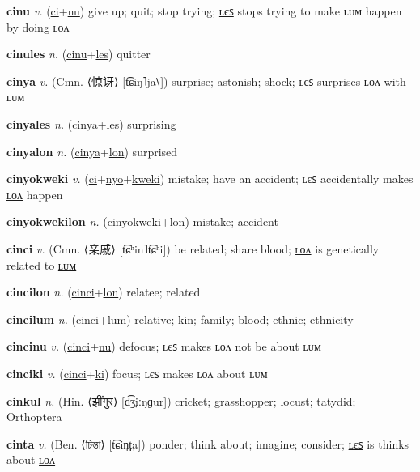 \textbf{\hypertarget{cinu}{cinu}} \textit{v.} (\hyperlink{ci}{ci}+\allowbreak \hyperlink{nu}{nu})
give up; quit; stop trying; \hyperlink{cinules}{ʟєꜱ} stops trying to make ʟᴜᴍ happen by doing ʟᴏᴧ

\textbf{\hypertarget{cinules}{cinules}} \textit{n.} (\hyperlink{cinu}{cinu}+\allowbreak \hyperlink{les}{les})
quitter

\textbf{\hypertarget{cinya}{cinya}} \textit{v.} (Cmn. ⟨{\chinese{}惊讶}⟩ [t͡ɕiŋ˥ja˥˩])
surprise; astonish; shock; \hyperlink{cinyales}{ʟєꜱ} surprises \hyperlink{cinyalon}{ʟᴏᴧ} with ʟᴜᴍ

\textbf{\hypertarget{cinyales}{cinyales}} \textit{n.} (\hyperlink{cinya}{cinya}+\allowbreak \hyperlink{les}{les})
surprising

\textbf{\hypertarget{cinyalon}{cinyalon}} \textit{n.} (\hyperlink{cinya}{cinya}+\allowbreak \hyperlink{lon}{lon})
surprised

\textbf{\hypertarget{cinyokweki}{cinyokweki}} \textit{v.} (\hyperlink{ci}{ci}+\allowbreak \hyperlink{nyo}{nyo}+\allowbreak \hyperlink{kweki}{kweki})
mistake; have an accident; ʟєꜱ accidentally makes \hyperlink{cinyokwekilon}{ʟᴏᴧ} happen

\textbf{\hypertarget{cinyokwekilon}{cinyokwekilon}} \textit{n.} (\hyperlink{cinyokweki}{cinyokweki}+\allowbreak \hyperlink{lon}{lon})
mistake; accident

\textbf{\hypertarget{cinci}{cinci}} \textit{v.} (Cmn. ⟨{\chinese{}亲戚}⟩ [t͡ɕʰin˥t͡ɕʰi])
be related; share blood; \hyperlink{cincilon}{ʟᴏᴧ} is genetically related to \hyperlink{cincilum}{ʟᴜᴍ}

\textbf{\hypertarget{cincilon}{cincilon}} \textit{n.} (\hyperlink{cinci}{cinci}+\allowbreak \hyperlink{lon}{lon})
relatee; related

\textbf{\hypertarget{cincilum}{cincilum}} \textit{n.} (\hyperlink{cinci}{cinci}+\allowbreak \hyperlink{lum}{lum})
relative; kin; family; blood; ethnic; ethnicity

\textbf{\hypertarget{cincinu}{cincinu}} \textit{v.} (\hyperlink{cinci}{cinci}+\allowbreak \hyperlink{nu}{nu})
defocus; ʟєꜱ makes ʟᴏᴧ not be about ʟᴜᴍ

\textbf{\hypertarget{cinciki}{cinciki}} \textit{v.} (\hyperlink{cinci}{cinci}+\allowbreak \hyperlink{ki}{ki})
focus; ʟєꜱ makes ʟᴏᴧ about ʟᴜᴍ

\textbf{\hypertarget{cinkul}{cinkul}} \textit{n.} (Hin. ⟨{\devanagari{}झींगुर}⟩ [d͡ʒ̤iːŋɡur])
cricket; grasshopper; locust; tatydid; Orthoptera

\textbf{\hypertarget{cinta}{cinta}} \textit{v.} (Ben. ⟨{\bengali{}চিন্তা}⟩ [t͡ɕin̪t̪a])
ponder; think about; imagine; consider; \hyperlink{cintales}{ʟєꜱ} is thinks about \hyperlink{cintalon}{ʟᴏᴧ}

